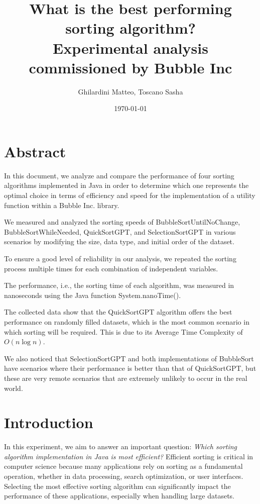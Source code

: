 \documentclass{article}
\title{What is the best performing sorting algorithm? \\ \large Experimental analysis commissioned by Bubble Inc}
\author{Ghilardini Matteo, Toscano Sasha}
\date{\today}
\begin{document}
\maketitle

\section*{Abstract}
    In this document, we analyze and compare the performance of four sorting algorithms implemented in Java in order to determine which one represents the optimal choice in terms of efficiency and speed for the implementation of a utility function within a Bubble Inc. library.
    
    We measured and analyzed the sorting speeds of BubbleSortUntilNoChange, BubbleSortWhileNeeded, QuickSortGPT, and SelectionSortGPT in various scenarios by modifying the size, data type, and initial order of the dataset.
    
    To ensure a good level of reliability in our analysis, we repeated the sorting process multiple times for each combination of independent variables.
    
    The performance, i.e., the sorting time of each algorithm, was measured in nanoseconds using the Java function System.nanoTime().
    
    The collected data show that the QuickSortGPT algorithm offers the best performance on randomly filled datasets, which is the most common scenario in which sorting will be required. This is due to its Average Time Complexity of $O(n \log n)$.
    
    We also noticed that SelectionSortGPT and both implementations of BubbleSort have scenarios where their performance is better than that of QuickSortGPT, but these are very remote scenarios that are extremely unlikely to occur in the real world.
    

\section{Introduction}
    In this experiment, we aim to answer an important question: \textit{Which sorting algorithm implementation in Java is most efficient?} Efficient sorting is critical in computer science because many applications rely on sorting as a fundamental operation, whether in data processing, search optimization, or user interfaces. Selecting the most effective sorting algorithm can significantly impact the performance of these applications, especially when handling large datasets. 
    
\end{document}
